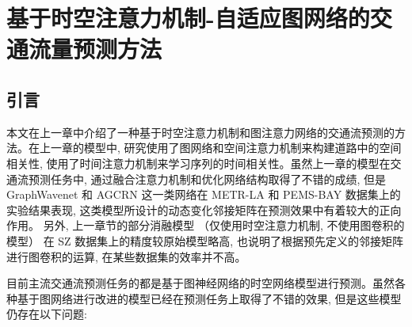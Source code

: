 
\chapter{基于时空注意力机制-自适应图网络的交通流量预测方法}
\section{引言}

本文在上一章中介绍了一种基于时空注意力机制和图注意力网络的交通流预测的方法。在上一章的模型中, 研究使用了图网络和空间注意力机制来构建道路中的空间相关性, 使用了时间注意力机制来学习序列的时间相关性。虽然上一章的模型在交通流预测任务中, 通过融合注意力机制和优化网络结构取得了不错的成绩, 但是 GraphWavenet \parencite{2019_Wu_Graph_WaveNet_A_deep_learning_framework_for_traffic_forecasting} 和 AGCRN 这一类网络在 METR-LA 和 PEMS-BAY 数据集上的实验结果表现, 这类模型所设计的动态变化邻接矩阵在预测效果中有着较大的正向作用。 另外, 上一章节的部分消融模型 （仅使用时空注意力机制, 不使用图卷积的模型） 在 SZ 数据集上的精度较原始模型略高, 也说明了根据预先定义的邻接矩阵进行图卷积的运算, 在某些数据集的效率并不高。

目前主流交通流预测任务的都是基于图神经网络的时空网络模型进行预测。虽然各种基于图网络进行改进的模型已经在预测任务上取得了不错的效果, 但是这些模型仍存在以下问题:

